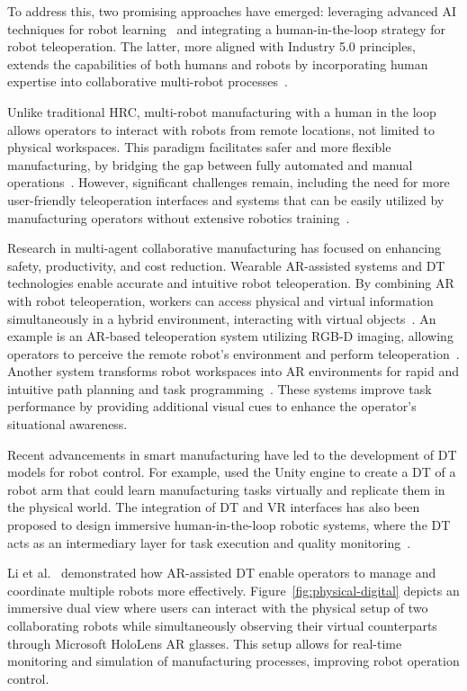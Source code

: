 To address this, two promising approaches have emerged: leveraging advanced \ac{AI} techniques for robot learning~\cite{6-ar-dt} and integrating a human-in-the-loop strategy for robot teleoperation. The latter, more aligned with Industry 5.0 principles, extends the capabilities of both humans and robots by incorporating human expertise into collaborative multi-robot processes~\cite{7-ar-dt}.

Unlike traditional \ac{HRC}, multi-robot manufacturing with a human in the loop allows operators to interact with robots from remote locations, not limited to physical workspaces. This paradigm facilitates safer and more flexible manufacturing, by bridging the gap between fully automated and manual operations~\cite{7-ar-dt}. However, significant challenges remain, including the need for more user-friendly teleoperation interfaces and systems that can be easily utilized by manufacturing operators without extensive robotics training~\cite{9-ar-dt}.

Research in multi-agent collaborative manufacturing has focused on enhancing safety, productivity, and cost reduction. Wearable \ac{AR}-assisted systems and \ac{DT} technologies enable accurate and intuitive robot teleoperation. By combining \ac{AR} with robot teleoperation, workers can access physical and virtual information simultaneously in a hybrid environment, interacting with virtual objects~\cite{26-ar-dt,27-ar-dt}. An example is an \ac{AR}-based teleoperation system utilizing RGB-D imaging, allowing operators to perceive the remote robot's environment and perform teleoperation~\cite{10-ar-dt}. Another system transforms robot workspaces into \ac{AR} environments for rapid and intuitive path planning and task programming~\cite{30-ar-dt}. These systems improve task performance by providing additional visual cues to enhance the operator's situational awareness.

Recent advancements in smart manufacturing have led to the development of \ac{DT} models for robot control. For example, \cite{37-ar-dt} used the Unity engine to create a \ac{DT} of a robot arm that could learn manufacturing tasks virtually and replicate them in the physical world. The integration of \ac{DT} and \ac{VR} interfaces has also been proposed to design immersive human-in-the-loop robotic systems, where the \ac{DT} acts as an intermediary layer for task execution and quality monitoring~\cite{41-ar-dt,42-ar-dt}.

Li et al.~\cite{LI2022102321} demonstrated how \ac{AR}-assisted \ac{DT} enable operators to manage and coordinate multiple robots more effectively.
Figure~\ref{fig:physical-digital} depicts an immersive dual view where users can interact with the physical setup of two collaborating robots while simultaneously observing their virtual counterparts through Microsoft HoloLens \ac{AR} glasses. This setup allows for real-time monitoring and simulation of manufacturing processes, improving robot operation control.

